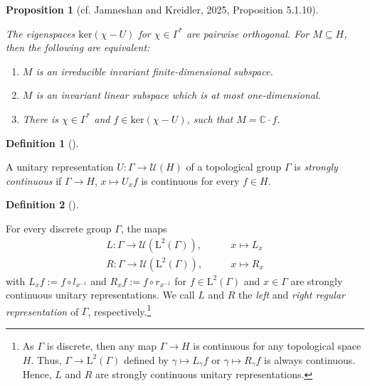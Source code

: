 \documentclass[
  british,
]{article}
\providecommand{\tightlist}{%
  \setlength{\itemsep}{0pt}\setlength{\parskip}{0pt}}
\theoremstyle{definition}
\theoremstyle{definition}
\newtheorem{definition}{Definition}[section]
\theoremstyle{plain}
\newtheorem{proposition}{Proposition}[section]
\theoremstyle{remark}
\newcommand{\AmenableGroup}{{\Gamma}}
\newcommand{\AmenableGroupElement}{{\gamma}}
\newcommand{\Dual}[1]{{#1}^{*}}
\newcommand{\Group}{{\Gamma}}
\newcommand{\HilbertSpace}{{H}}
\begin{document}
\begin{proposition}[{cf. Jamneshan and Kreidler, 2025, Proposition
5.1.10}]\protect\hypertarget{prp-POrthogonalEigenspaces}{}\label{prp-POrthogonalEigenspaces}

The eigenspaces \(\text{ker}(\chi-U)\) for \(\chi\in\Dual{\Group}\) are
pairwise orthogonal. For \(M\subseteq \HilbertSpace\), then the
following are equivalent:

\begin{enumerate}
\def\labelenumi{\arabic{enumi}.}
\tightlist
\item
  \(M\) is an irreducible invariant finite-dimensional subspace.
\item
  \(M\) is an invariant linear subspace which is at most
  one-dimensional.
\item
  There is \(\chi\in\Dual{\Group}\) and \(f\in\text{ker}(\chi-U)\), such
  that \(M=\mathbb{C}\cdot f\).
\end{enumerate}

\end{proposition}

\begin{definition}[]\protect\hypertarget{def-StronglyContinuous}{}\label{def-StronglyContinuous}

A unitary representation
\(U:\AmenableGroup\rightarrow\mathscr{U}(\HilbertSpace)\) of a
topological group \(\AmenableGroup\) is \emph{strongly continuous} if
\(\AmenableGroup\rightarrow \HilbertSpace\), \(x\mapsto U_xf\) is
continuous for every \(f\in \HilbertSpace\).

\end{definition}

\begin{definition}[]\protect\hypertarget{def-RegularRepresentation}{}\label{def-RegularRepresentation}

For every discrete group \(\AmenableGroup\), the maps \begin{align}
    L:\AmenableGroup\rightarrow\mathscr{U}(\text{L}^2(\AmenableGroup)),&\qquad x\mapsto L_x
    \\ R:\AmenableGroup\rightarrow\mathscr{U}(\text{L}^2(\AmenableGroup)),&\qquad x\mapsto R_x
\end{align} with \(L_xf:=f\circ l_{x^{-1}}\) and
\(R_xf:=f\circ r_{x^{-1}}\) for \(f\in\text{L}^2(\AmenableGroup)\) and
\(x\in\AmenableGroup\) are strongly continuous unitary representations.
We call \(L\) and \(R\) the \emph{left} and \emph{right regular
representation} of \(\AmenableGroup\), respectively.\footnote{As
  \(\AmenableGroup\) is discrete, then any map
  \(\AmenableGroup\rightarrow \HilbertSpace\) is continuous for any
  topological space \(\HilbertSpace\). Thus,
  \(\AmenableGroup\rightarrow \text{L}^2(\AmenableGroup)\) defined by
  \(\AmenableGroupElement\mapsto L_\AmenableGroupElement f\) or
  \(\AmenableGroupElement\mapsto R_\AmenableGroupElement f\) is always
  continuous. Hence, \(L\) and \(R\) are strongly continuous unitary
  representations.}

\end{definition}
\end{document}
